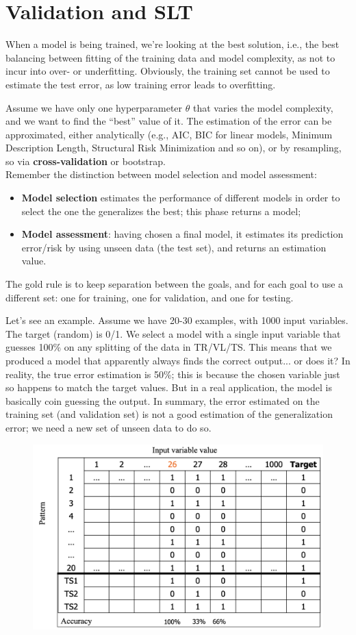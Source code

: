\chapter{Validation and SLT}

When a model is being trained, we're looking at the best solution, i.e., the best balancing between fitting of the training data and model complexity, as not to incur into over- or underfitting. Obviously, the training set cannot be used to estimate the test error, as low training error leads to overfitting.

Assume we have only one hyperparameter $\theta$ that varies the model complexity, and we want to find the ``best'' value of it. The estimation of the error can be approximated, either analytically (e.g., AIC, BIC for linear models, Minimum Description Length, Structural Risk Minimization and so on), or by resampling, so via \textbf{cross-validation} or bootstrap.\\
Remember the distinction between model selection and model assessment:
\begin{itemize}
    \item \textbf{Model selection} estimates the performance of different models in order to select the one the generalizes the best; this phase returns a model;

    \item \textbf{Model assessment}: having chosen a final model, it estimates its prediction error/risk by using unseen data (the test set), and returns an estimation value.
\end{itemize}
The gold rule is to keep separation between the goals, and for each goal to use a different set: one for training, one for validation, and one for testing.

Let's see an example. Assume we have 20-30 examples, with 1000 input variables. The target (random) is 0/1. We select a model with a single input variable that guesses 100\% on any splitting of the data in TR/VL/TS. This means that we produced a model that apparently always finds the correct output... or does it? In reality, the true error estimation is 50\%; this is because the chosen variable just so happens to match the target values. But in a real application, the model is basically coin guessing the output. In summary, the error estimated on the training set (and validation set) is not a good estimation of the generalization error; we need a new set of unseen data to do so.

\begin{figure}[h]
    \centering\includegraphics[width=0.5\linewidth]{img/table_counterex.png}
\end{figure}

